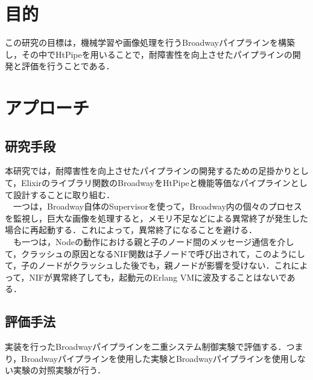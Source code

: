 \documentclass[a4paper]{jreport}	%
\begin{document}



\section{目的}
この研究の目標は，機械学習や画像処理を行うBroadwayパイプラインを構築し，その中でHtPipeを用いることで，耐障害性を向上させたパイプラインの開発と評価を行うことである．
\section{アプローチ}
\subsection{研究手段}
本研究では，耐障害性を向上させたパイプラインの開発するための足掛かりとして，Elixirのライブラリ関数のBroadwayをHtPipeと機能等価なパイプラインとして設計することに取り組む．
\\　一つは，Broadway自体のSupervisorを使って，Broadway内の個々のプロセスを監視し，巨大な画像を処理すると，メモリ不足などによる異常終了が発生した場合に再起動する．これによって，異常終了になることを避ける．
\\　も一つは，Nodeの動作における親と子のノード間のメッセージ通信を介して，クラッシュの原因となるNIF関数は子ノードで呼び出されて，このようにして，子のノードがクラッシュした後でも，親ノードが影響を受けない．これによって，NIFが異常終了しても，起動元のErlang VMに波及することはないである．
\subsection{評価手法}
実装を行ったBroadwayパイプラインを二重システム制御実験で評価する．つまり，Broadwayパイプラインを使用した実験とBroadwayパイプラインを使用しない実験の対照実験が行う．
\end{document}
